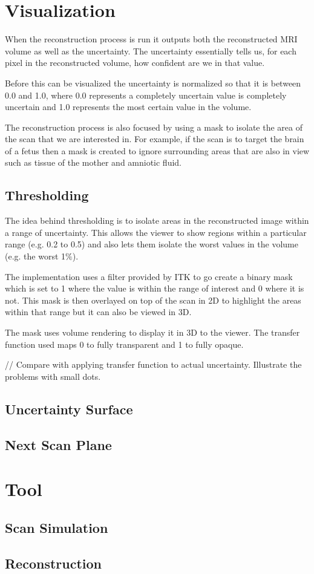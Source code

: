 \chapter{Visualization}

When the reconstruction process is run it outputs both the reconstructed MRI volume as well as the uncertainty. The uncertainty essentially tells us, for each pixel in the reconstructed volume, how confident are we in that value.

Before this can be visualized the uncertainty is normalized so that it is between 0.0 and 1.0, where 0.0 represents a completely uncertain value is completely uncertain and 1.0 represents the most certain value in the volume.

The reconstruction process is also focused by using a mask to isolate the area of the scan that we are interested in. For example, if the scan is to target the brain of a fetus then a mask is created to ignore surrounding areas that are also in view such as tissue of the mother and amniotic fluid.

\section{Thresholding}\label{section:thresholding}

The idea behind thresholding is to isolate areas in the reconstructed image within a range of uncertainty. This allows the viewer to show regions within a particular range (e.g. 0.2 to 0.5) and also lets them isolate the worst values in the volume (e.g. the worst 1$\%$).

The implementation uses a filter provided by ITK to go create a binary mask which is set to 1 where the value is within the range of interest and 0 where it is not. This mask is then overlayed on top of the scan in 2D to highlight the areas within that range but it can also be viewed in 3D.

The mask uses volume rendering to display it in 3D to the viewer. The transfer function used maps 0 to fully transparent and 1 to fully opaque.

// Compare with applying transfer function to actual uncertainty. Illustrate the problems with small dots.

\section{Uncertainty Surface}\label{section:uncertaintysurface}

\section{Next Scan Plane}\label{section:nextscanplane}

\chapter{Tool}

\section{Scan Simulation}\label{section:simulatescan}

\section{Reconstruction}\label{section:reconstruction}